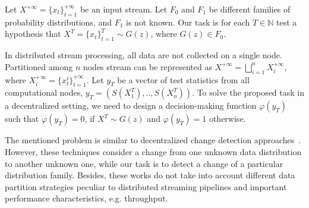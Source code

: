 \label {fs-short-model}

Let $X^{+\infty}=\{x_t\}_{t=1}^{+\infty}$ be an input stream. Let $F_0$ and $F_1$ be different families of probability distributions, and $F_1$ is not known. Our task is for each $T\in \mathbb{N}$ test a hypothesis that $X^T=\{x_t\}_{t=1}^{T} \sim G(z)$, where $G(z) \in F_0$.

In distributed stream processing, all data are not collected on a single node. Partitioned among $n$ nodes stream can be represented as $X^{+\infty}=\bigsqcup_{i=1}^n X_i^{+\infty}$, where $X_i^{+\infty}=\{x_t^i\}_{t=1}^{+\infty}$. Let $y_T$ be a vector of test statistics from all computational nodes,  $y_T = (S(X_1^T),..,S(X_n^T))$. To solve the proposed task in a decentralized setting, we need to design a decision-making function $\varphi(y_T)$ such that $\varphi(y_T) = 0$, if $X^T \sim G(z)$  and $\varphi(y_T) = 1$ otherwise.

The mentioned problem is similar to decentralized change detection approaches~\cite{tartakovsky2008asymptotically, tran2014change}. However, these techniques consider a change from one unknown data distribution to another unknown one, while our task is to detect a change of a particular distribution family. Besides, these works do not take into account different data partition strategies peculiar to distributed streaming pipelines and important performance characteristics, e.g. throughput.